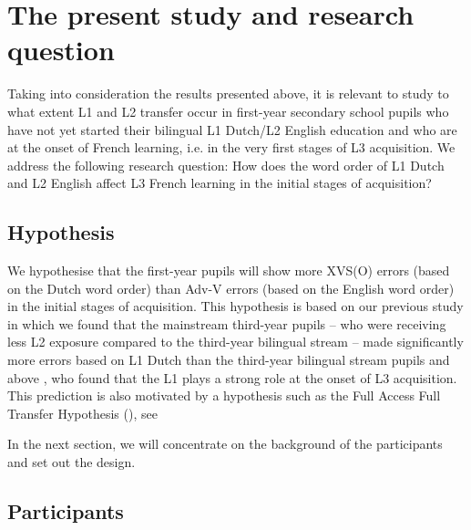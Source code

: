 \documentclass[output=paper]{langsci/langscibook}
\begin{document}
\section{{The} {present} {study} {and} {research} {question}}%
\label{sec:stadt:3}

Taking into consideration the results presented above, it is relevant to study to what extent L1 and L2 transfer occur in first-year secondary school pupils who have not yet started their bilingual L1 Dutch/L2 English education and who are at the onset of French learning, i.e. in the very first stages of L3 acquisition. We address the following research question: How does the word order of L1 Dutch and L2 English affect L3 French learning in the initial stages of acquisition?

\subsection{{Hypothesis} }%
\label{sec:stadt:3.1}

We hypothesise that the first-year pupils will show more XVS(O) errors (based on the Dutch word order) than Adv-V errors (based on the English word order) in the initial stages of acquisition. This hypothesis is based on our previous study \citep{StadtEtAl2016} in which we found that the mainstream third-year pupils – who were receiving less L2 exposure compared to the third-year bilingual stream – made significantly more errors based on L1 Dutch than the third-year bilingual stream pupils and above \citep{Hermas2010, Hermas2014Morphosyntax, Hermas2014Relatives}, who found that the L1 plays a strong role at the onset of L3 acquisition. This prediction is also motivated by a hypothesis such as the Full Access Full Transfer Hypothesis (\citealt{SchwartzSprouse1996}), see 

In the next section, we will concentrate on the background of the participants and set out the design.

\subsection{{Participants}}
\label{sec:stadt:3.2}
\end{document}
